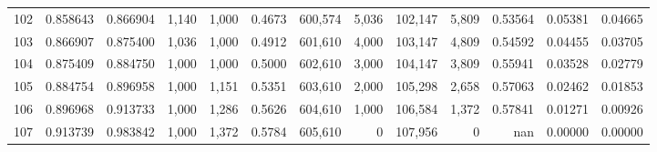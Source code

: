 \begin{tabular}{rrrrrrrrrrrrr}
102 &  0.858643 &  0.866904 &   1,140 &  1,000 &                                     0.4673 &  600,574 &    5,036 &  102,147 &    5,809 &  0.53564 &  0.05381 &  0.04665 \\
103 &  0.866907 &  0.875400 &   1,036 &  1,000 &                                     0.4912 &  601,610 &    4,000 &  103,147 &    4,809 &  0.54592 &  0.04455 &  0.03705 \\
104 &  0.875409 &  0.884750 &   1,000 &  1,000 &                                     0.5000 &  602,610 &    3,000 &  104,147 &    3,809 &  0.55941 &  0.03528 &  0.02779 \\
105 &  0.884754 &  0.896958 &   1,000 &  1,151 &                                     0.5351 &  603,610 &    2,000 &  105,298 &    2,658 &  0.57063 &  0.02462 &  0.01853 \\
106 &  0.896968 &  0.913733 &   1,000 &  1,286 &                                     0.5626 &  604,610 &    1,000 &  106,584 &    1,372 &  0.57841 &  0.01271 &  0.00926 \\
107 &  0.913739 &  0.983842 &   1,000 &  1,372 &                                     0.5784 &  605,610 &        0 &  107,956 &        0 &      nan &  0.00000 &  0.00000 \\
\bottomrule
\end{tabular}

